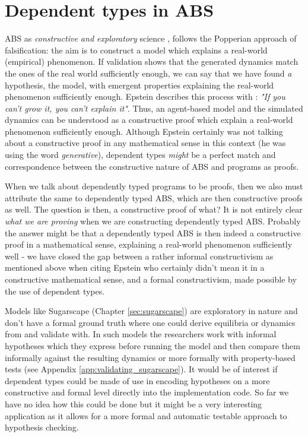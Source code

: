 \section{Dependent types in ABS}
\label{sec:dep_vav_deptypes}
ABS as \textit{constructive and exploratory} science \cite{epstein_chapter_2006, epstein_generative_2012}, follows the Popperian \cite{popper_logic_2002} approach of falsification: the aim is to construct a model which explains a real-world (empirical) phenomenon. If validation shows that the generated dynamics match the ones of the real world sufficiently enough, we can say that we have found \textit{a} hypothesis, the model, with emergent properties explaining the real-world phenomenon sufficiently enough. %
Epstein describes this process with \cite{epstein_chapter_2006}: \textit{"If you can't grow it, you can't explain it"}. Thus, an agent-based model and the simulated dynamics can be understood as a constructive proof which explain a real-world phenomenon sufficiently enough. Although Epstein certainly was not talking about a constructive proof in any mathematical sense in this context (he was using the word \textit{generative}), dependent types \textit{might} be a perfect match and correspondence between the constructive nature of ABS and programs as proofs.

When we talk about dependently typed programs to be proofs, then we also must attribute the same to dependently typed ABS, which are then constructive proofs as well. The question is then, a constructive proof of what? It is not entirely clear \textit{what we are proving} when we are constructing dependently typed ABS. Probably the answer might be that a dependently typed ABS is then indeed a constructive proof in a mathematical sense, explaining a real-world phenomenon sufficiently well - we have closed the gap between a rather informal constructivism as mentioned above when citing Epstein who certainly didn't mean it in a constructive mathematical sense, and a formal constructivism, made possible by the use of dependent types.

\medskip

Models like Sugarscape (Chapter \ref{sec:sugarscape}) are exploratory in nature and don't have a formal ground truth where one could derive equilibria or dynamics from and validate with. In such models the researchers work with informal hypotheses which they express before running the model and then compare them informally against the resulting dynamics or more formally with property-based tests (see Appendix \ref{app:validating_sugarscape}). It would be of interest if dependent types could be made of use in encoding hypotheses on a more constructive and formal level directly into the implementation code. So far we have no idea how this could be done but it might be a very interesting application as it allows for a more formal and automatic testable approach to hypothesis checking.

